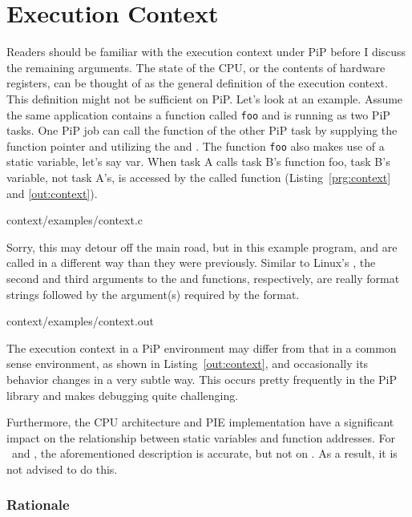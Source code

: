 
\section{Execution Context}\label{sec:context}

Readers should be familiar with the execution context under PiP before
I discuss the remaining arguments. The state of the CPU, or the
contents of hardware registers, can be thought of as the general
definition of the execution context. This definition might not be
sufficient on PiP. Let's look at an example. Assume the same
application contains a function called {\tt foo} and is running as two PiP
tasks. One PiP job can call the function of the other PiP task by
supplying the function pointer and utilizing the
 and . The
function {\tt foo} also makes use of a static variable, let's say 
var. When task A calls task B's function foo, task B's variable, not
task A's, is accessed by the called function
(Listing~\ref{prg:context} and \ref{out:context}). 

 {context/examples/context.c}


Sorry, this may detour off the main road, but in this example program,
 and 
 are called in a different way than they were
previously. Similar to Linux's , the second and third
arguments to the  and 
 functions, respectively, are
really format strings followed by the argument(s) required by the
format.
 

                {context/examples/context.out}

The execution context in a PiP environment may differ from that in a
common sense environment, as shown in Listing~\ref{out:context}, and
occasionally its behavior changes in a very subtle way. This occurs
pretty frequently in the PiP library and makes debugging quite
challenging. 

Furthermore, the CPU architecture and PIE implementation have a
significant impact on the relationship between static variables and
function addresses. For \AMD\ and \ARM, the aforementioned
description is accurate, but not on \INTEL. As a result, it is not
advised to do this.

\subsubsection*{Rationale}

